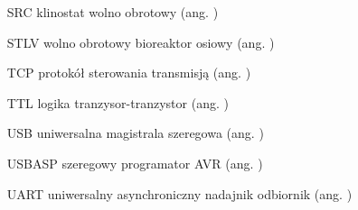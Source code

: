 \begin{itemize}
	\item[SRC] klinostat wolno obrotowy ({ang. })
	\item[STLV] wolno obrotowy bioreaktor osiowy  ({ang. })
	\item[TCP] protokół sterowania transmisją ({ang. })
	\item[TTL] logika tranzysor-tranzystor ({ang. })
	\item[USB] uniwersalna magistrala szeregowa ({ang. })
	\item[USBASP] szeregowy programator AVR ({ang. })
	\item[UART] uniwersalny asynchroniczny nadajnik odbiornik ({ang. })

\end{itemize}
